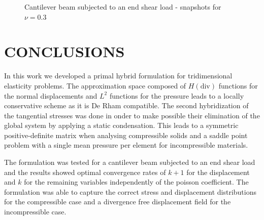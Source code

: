 \documentclass{wccm2024}
\begin{document}
\begin{figure}
    \caption{Cantilever beam subjected to an end shear load - snapshots for $\nu=0.3$}
    \label{fig:bishop-snapshot}
\end{figure}

\section{CONCLUSIONS}

In this work we developed a primal hybrid formulation for tridimensional elasticity problems. The approximation space composed of $H(\text{div})$ functions for the normal displacements and $L^2$ functions for the pressure leads to a locally conservative scheme as it is De Rham compatible. The second hybridization of the tangential stresses was done in onder to make possible their elimination of the global system by applying a static condensation. This leads to a symmetric positive-definite matrix when analysing compressible solids and a saddle point problem with a single mean pressure per element for incompressible materials.

The formulation was tested for a cantilever beam subjected to an end shear load and the results showed optimal convergence rates of $k+1$ for the displacement and $k$ for the remaining variables independently of the poisson coefficient. The formulation was able to capture the correct stress and displacement distributions for the compressible case and a divergence free displacement field for the incompressible case.



\end{document}
